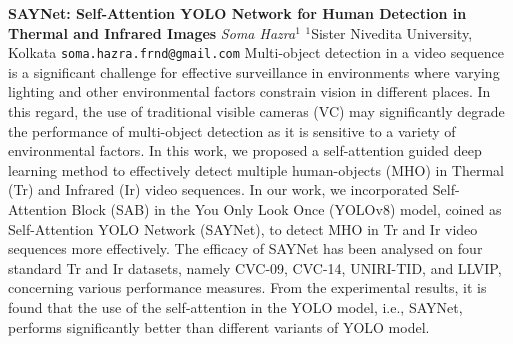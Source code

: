 
    \begin{conf-abstract}[]
        {\textbf{SAYNet: Self-Attention YOLO Network for Human Detection in Thermal and Infrared Images}}
        {\textit{Soma Hazra$^{1}$}}
        {$^{1}$Sister Nivedita University, Kolkata}
        {\texttt{soma.hazra.frnd@gmail.com}}
        {Multi-object detection in a video sequence is a significant challenge for effective surveillance in environments where varying lighting and other environmental factors constrain vision in different places. In this regard, the use of traditional visible cameras (VC) may significantly degrade the performance of multi-object detection as it is sensitive to a variety of environmental factors. In this work, we proposed a self-attention guided deep learning method to effectively detect multiple human-objects (MHO) in Thermal (Tr) and Infrared (Ir) video sequences. In our work, we incorporated Self-Attention Block (SAB) in the You Only Look Once (YOLOv8) model, coined as Self-Attention YOLO Network (SAYNet), to detect MHO in Tr and Ir video sequences more effectively. The efficacy of SAYNet has been analysed on four standard Tr and Ir datasets, namely CVC-09, CVC-14, UNIRI-TID, and LLVIP, concerning various performance measures. From the experimental results, it is found that the use of the self-attention in the YOLO model, i.e., SAYNet, performs significantly better than different variants of YOLO model.}
    \end{conf-abstract}
        